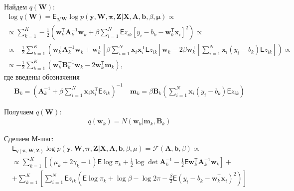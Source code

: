\documentclass[12pt, twoside]{article}
\numberwithin{equation}{section}
\begin{document}
Найдем $q\left(\textbf{W}\right)$:
\begin{equation}
\label{eq:st:16}
\begin{aligned}
\log q(\textbf{W}) = \mathsf{E}_{q/\textbf{W}}\log p(\textbf{y}, \textbf{W}, \bm{\pi}, \textbf{Z}|\textbf{X}, \textbf{A}, \textbf{b}, \beta, \bm{\mu}) \propto \\
 \propto \sum_{k=1}^{K}-\frac{1}{2}\left(\textbf{w}_k^{\mathsf{T}}\textbf{A}_k^{-1}\textbf{w}_k + \beta\sum_{i=1}^{N}\mathsf{E}z_{ik}\left[y_i - b_k -\textbf{w}_k^{\mathsf{T}}\textbf{x}_i\right]^2\right) \propto \\
\propto -\frac{1}{2}\sum_{k=1}^{K}\left(\textbf{w}_k^{\mathsf{T}}\textbf{A}_k^{-1}\textbf{w}_k + \textbf{w}_k^{\mathsf{T}}\left[\beta\sum_{i=1}^{N}\textbf{x}_i\textbf{x}_i^{\mathsf{T}}\mathsf{E}z_{ik}\right]\textbf{w}_k -2\beta\textbf{w}_k^{\mathsf{T}}\left[\sum_{i=1}^{N}\textbf{x}_i\left(y_i-b_k\right)\mathsf{E}z_{ik}\right]\right) \propto \\
\propto -\frac{1}{2}\sum_{k=1}^{K}\left(\textbf{w}_k^{\mathsf{T}}\textbf{B}_k^{-1}\textbf{w}_k - 2\textbf{w}_k^{\mathsf{T}}\textbf{m}_k \right),
\end{aligned}
\end{equation}
где введены обозначения
\begin{equation}
\label{eq:st:17}
\begin{aligned}
\textbf{B}_k = \left(\textbf{A}_k^{-1} + \beta\sum_{i=1}^{N}\textbf{x}_i\textbf{x}_i^{\mathsf{T}}\mathsf{E}z_{ik}\right)^{-1} \quad \textbf{m}_k = \beta\textbf{B}_k\left(\sum_{i=1}^{N}\textbf{x}_i\left(y_i-b_k\right)\mathsf{E}z_{ik} \right)
\end{aligned}
\end{equation}

Получаем  $q\left(\textbf{W}\right)$:
\begin{equation}
\label{eq:st:18}
\begin{aligned}
q(\textbf{w}_k) = N(\textbf{w}_k|\textbf{m}_k, \textbf{B}_k)
\end{aligned}
\end{equation}

Сделаем М-шаг:
\begin{equation}
\label{eq:st:19}
\begin{aligned}
\mathsf{E}_{q(\bm{\pi}, \textbf{W}, \textbf{Z})} \log p(\textbf{y}, \textbf{W}, \bm{\pi}, \textbf{Z}|\textbf{X}, \textbf{A}, \textbf{b}, \beta, \mu) = \mathcal{F}(\textbf{A}, \textbf{b}, \beta) \propto \\
 \propto\sum_{k=1}^{K}\left[ \left(\mu_k+2\gamma_k - 1\right)\mathsf{E}\log\pi_k +\frac{1}{2}\log\det\textbf{A}_k^{-1} -\frac{1}{2}\mathsf{E}\textbf{w}_k^{\mathsf{T}}\textbf{A}_{k}^{-1}\textbf{w}_k\right] + \\
+ \sum_{k=1}^{K}\left[ \sum_{i=1}^{N}\mathsf{E}z_{ik}\left(\mathsf{E}\log\pi_k + \log\beta - \log2\pi -\frac{\beta}{2}\mathsf{E}\left(y_i - b_k - \textbf{w}_k^{\mathsf{T}}\textbf{x}_i\right)^2\right)\right]
\end{aligned}
\end{equation}
\end{document}
